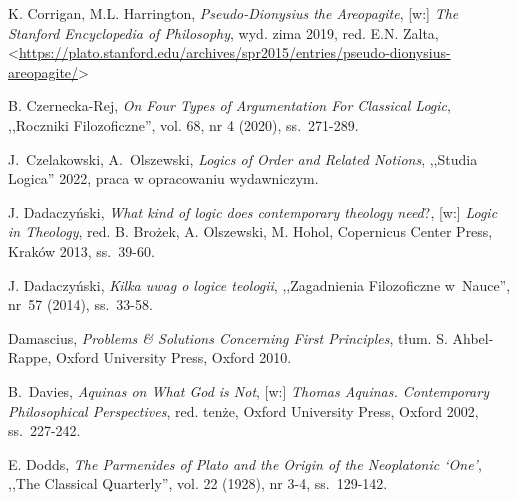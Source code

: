 \begin{thebibliography}{100}
K. Corrigan, M.L. Harrington, \textit{Pseudo-Dionysius the Areopagite}, [w:] \textit{The Stanford Encyclopedia of Philosophy},
wyd. zima 2019, red. E.N. Zalta, {\textless}\url{https://plato.stanford.edu/archives/spr2015/entries/pseudo-dionysius-areopagite/}{\textgreater}

B. Czernecka-Rej, \textit{On Four Types of Argumentation For Classical Logic}, ,,Roczniki Filozoficzne'', vol. 68, nr 4 (2020), ss.~271-289.

J.~Czelakowski, A.~Olszewski, \textit{Logics of Order and Related Notions}, ,,Studia Logica'' 2022, praca w opracowaniu wydawniczym.

J. Dadaczyński, \textit{What kind of logic does contemporary theology need}?, [w:] \textit{Logic in Theology}, red. B. Brożek, A. Olszewski, M. Hohol, Copernicus Center Press, Kraków 2013, ss.~39-60.

J. Dadaczyński, \textit{Kilka uwag o logice teologii}, ,,Zagadnienia Filozoficzne w~Nauce'', nr~57 (2014), ss.~33-58.

Damascius, \textit{Problems \& Solutions Concerning First Principles}, tłum. S. Ahbel-Rappe, Oxford University Press, Oxford 2010.

B.~Davies, \textit{Aquinas on What God is Not}, [w:]  \textit{Thomas Aquinas. Contemporary Philosophical Perspectives}, red. tenże, Oxford University Press, Oxford 2002, ss.~227-242.


E. Dodds, \textit{The Parmenides of Plato and the Origin of the Neoplatonic ‘One'}, ,,The Classical Quarterly'', vol. 22 (1928), nr 3-4, ss.~129-142.




\end{thebibliography}
